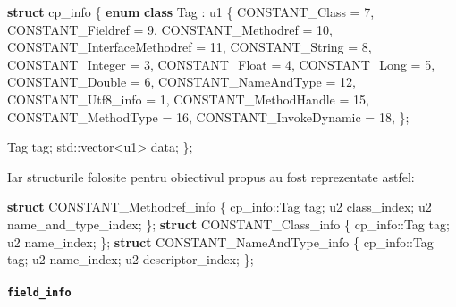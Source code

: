\documentclass[]{article}
\newenvironment{Shaded}{}{}
\newcommand{\KeywordTok}[1]{\textcolor[rgb]{0.00,0.44,0.13}{\textbf{#1}}}
\newcommand{\DecValTok}[1]{\textcolor[rgb]{0.25,0.63,0.44}{#1}}
\newcommand{\BuiltInTok}[1]{#1}
\newcommand{\NormalTok}[1]{#1}
\let\oldparagraph\paragraph
\renewcommand{\paragraph}[1]{\oldparagraph{#1}\mbox{}}
\begin{document}
\begin{Shaded}
\begin{Highlighting}[]
\KeywordTok{struct}\NormalTok{ cp_info \{}
    \KeywordTok{enum} \KeywordTok{class}\NormalTok{ Tag : u1 \{}
\NormalTok{        CONSTANT_Class = }\DecValTok{7}\NormalTok{,}
\NormalTok{        CONSTANT_Fieldref = }\DecValTok{9}\NormalTok{,}
\NormalTok{        CONSTANT_Methodref = }\DecValTok{10}\NormalTok{,}
\NormalTok{        CONSTANT_InterfaceMethodref = }\DecValTok{11}\NormalTok{,}
\NormalTok{        CONSTANT_String = }\DecValTok{8}\NormalTok{,}
\NormalTok{        CONSTANT_Integer = }\DecValTok{3}\NormalTok{,}
\NormalTok{        CONSTANT_Float = }\DecValTok{4}\NormalTok{,}
\NormalTok{        CONSTANT_Long = }\DecValTok{5}\NormalTok{,}
\NormalTok{        CONSTANT_Double = }\DecValTok{6}\NormalTok{,}
\NormalTok{        CONSTANT_NameAndType = }\DecValTok{12}\NormalTok{,}
\NormalTok{        CONSTANT_Utf8_info = }\DecValTok{1}\NormalTok{,}
\NormalTok{        CONSTANT_MethodHandle = }\DecValTok{15}\NormalTok{,}
\NormalTok{        CONSTANT_MethodType = }\DecValTok{16}\NormalTok{,}
\NormalTok{        CONSTANT_InvokeDynamic = }\DecValTok{18}\NormalTok{,}
\NormalTok{    \};}

\NormalTok{    Tag tag;}
    \BuiltInTok{std::}\NormalTok{vector<u1> data;}
\NormalTok{\};}
\end{Highlighting}
\end{Shaded}

Iar structurile folosite pentru obiectivul propus au fost reprezentate
astfel:

\begin{Shaded}
\begin{Highlighting}[]
\KeywordTok{struct}\NormalTok{ CONSTANT_Methodref_info \{}
\NormalTok{    cp_info::Tag tag;}
\NormalTok{    u2 class_index;}
\NormalTok{    u2 name_and_type_index;}
\NormalTok{\};}
\KeywordTok{struct}\NormalTok{ CONSTANT_Class_info \{}
\NormalTok{    cp_info::Tag tag;}
\NormalTok{    u2 name_index;}
\NormalTok{\};}
\KeywordTok{struct}\NormalTok{ CONSTANT_NameAndType_info \{}
\NormalTok{    cp_info::Tag tag;}
\NormalTok{    u2 name_index;}
\NormalTok{    u2 descriptor_index;}
\NormalTok{\};}
\end{Highlighting}
\end{Shaded}

\paragraph{\texorpdfstring{\texttt{field\_info}}{field\_info}}\label{field_info}
\end{document}
